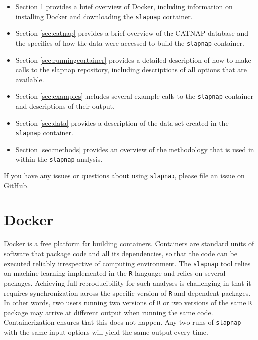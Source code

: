 \documentclass[]{article}
\providecommand{\tightlist}{%
  \setlength{\itemsep}{0pt}\setlength{\parskip}{0pt}}
\begin{document}
\begin{itemize}
\tightlist
\item
  Section \ref{sec:docker} provides a brief overview of Docker, including information on installing Docker and downloading the \texttt{slapnap} container.
\item
  Section \ref{sec:catnap} provides a brief overview of the CATNAP database and the specifics of how the data were accessed to build the \texttt{slapnap} container.
\item
  Section \ref{sec:runningcontainer} provides a detailed description of how to make calls to the slapnap repository, including descriptions of all options that are available.
\item
  Section \ref{sec:examples} includes several example calls to the \texttt{slapnap} container and descriptions of their output.
\item
  Section \ref{sec:data} provides a description of the data set created in the \texttt{slapnap} container.
\item
  Section \ref{sec:methods} provides an overview of the methodology that is used in within the \texttt{slapnap} analysis.
\end{itemize}

If you have any issues or questions about using \texttt{slapnap}, please \href{https://github.com/benkeser/slapnap/issues}{file an issue} on GitHub.

\hypertarget{sec:docker}{%
\section{Docker}\label{sec:docker}}

Docker is a free platform for building containers. Containers are standard units of software that package code and all its dependencies, so that the code can be executed reliably irrespective of computing environment. The \texttt{slapnap} tool relies on machine learning implemented in the \texttt{R} language and relies on several packages. Achieving full reproducibility for such analyses is challenging in that it requires synchronization across the specific version of \texttt{R} and dependent packages. In other words, two users running two versions of \texttt{R} or two versions of the same \texttt{R} package may arrive at different output when running the same code. Containerization ensures that this does not happen. Any two runs of \texttt{slapnap} with the same input options will yield the same output every time.
\end{document}
